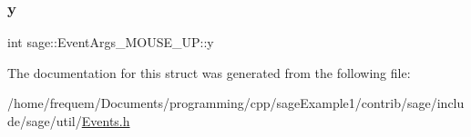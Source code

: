 \mbox{\label{structsage_1_1EventArgs__MOUSE__UP_a31ac9bc6c023388b35bbbff816922883}} 
\subsubsection{\texorpdfstring{y}{y}}
{\footnotesize\ttfamily int sage\+::\+Event\+Args\+\_\+\+M\+O\+U\+S\+E\+\_\+\+U\+P\+::y}



The documentation for this struct was generated from the following file\+:\begin{DoxyCompactItemize}
\item 
/home/frequem/\+Documents/programming/cpp/sage\+Example1/contrib/sage/include/sage/util/\mbox{\hyperlink{Events_8h}{Events.\+h}}\end{DoxyCompactItemize}
